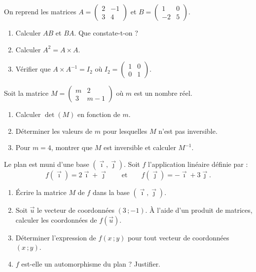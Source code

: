 \documentclass[11pt]{article}
\newcounter{popsec}
\newcounter{popsub}
\newcommand{\courssub}[1]{%
  \stepcounter{popsub}%
  \par\vspace{9pt}\noindent{\popxbold\fontsize{11.5}{13}\selectfont\color{popink}{\color{poporange}\thepopsec.\thepopsub}\hspace{6pt}#1}\par\nopagebreak\vspace{4pt}
}
\begin{document}
\courssub{Je m'entraîne}

\begin{exercice}
On reprend les matrices $A = \begin{pmatrix} 2 & -1 \\ 3 & 4 \end{pmatrix}$ et $B = \begin{pmatrix} 1 & 0 \\ -2 & 5 \end{pmatrix}$.
\begin{enumerate}
\item Calculer $AB$ et $BA$. Que constate-t-on ?
\item Calculer $A^2 = A \times A$.
\item Vérifier que $A \times A^{-1} = I_2$ où $I_2 = \begin{pmatrix} 1 & 0 \\ 0 & 1 \end{pmatrix}$.
\end{enumerate}
\end{exercice}

\begin{exercice}
Soit la matrice $M = \begin{pmatrix} m & 2 \\ 3 & m-1 \end{pmatrix}$ où $m$ est un nombre réel.
\begin{enumerate}
\item Calculer $\det(M)$ en fonction de $m$.
\item Déterminer les valeurs de $m$ pour lesquelles $M$ n'est pas inversible.
\item Pour $m = 4$, montrer que $M$ est inversible et calculer $M^{-1}$.
\end{enumerate}
\end{exercice}

\begin{exercice}
Le plan est muni d'une base $(\vec{\imath}, \vec{\jmath})$. Soit $f$ l'application linéaire définie par :
\[ f(\vec{\imath}) = 2\vec{\imath} + \vec{\jmath} \qquad \text{et} \qquad f(\vec{\jmath}) = -\vec{\imath} + 3\vec{\jmath}. \]
\begin{enumerate}
\item Écrire la matrice $M$ de $f$ dans la base $(\vec{\imath}, \vec{\jmath})$.
\item Soit $\vec{u}$ le vecteur de coordonnées $(3\,; -1)$. À l'aide d'un produit de matrices, calculer les coordonnées de $f(\vec{u})$.
\item Déterminer l'expression de $f(x\,; y)$ pour tout vecteur de coordonnées $(x\,; y)$.
\item $f$ est-elle un automorphisme du plan ? Justifier.
\end{enumerate}
\end{exercice}
\end{document}
